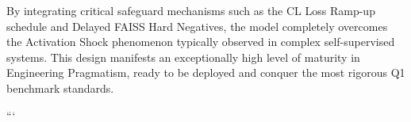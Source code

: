 By integrating critical safeguard mechanisms such as the CL Loss Ramp-up schedule and Delayed FAISS Hard Negatives, the model completely overcomes the Activation Shock phenomenon typically observed in complex self-supervised systems. This design manifests an exceptionally high level of maturity in Engineering Pragmatism, ready to be deployed and conquer the most rigorous Q1 benchmark standards.

\vspace{1em}
\renewcommand{\refname}{References}
\printbibliography


```